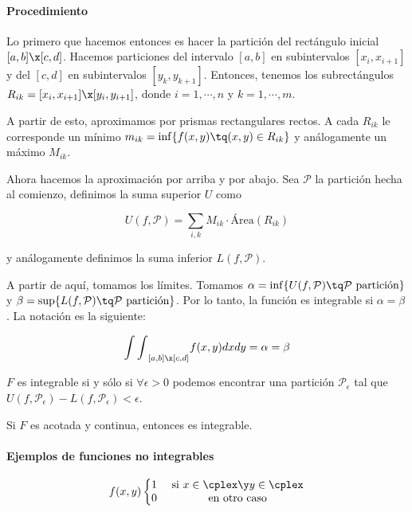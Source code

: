 \documentclass[12pt,a4paper,titlepage]{apuntes}
\begin{document}
\paragraph{Procedimiento}

Lo primero que hacemos entonces es hacer la partición del rectángulo inicial $[a,b]\x[c,d]$. Hacemos particiones del intervalo $[a,b]$ en subintervalos $[x_i, x_{i+1}]$ y del $[c,d]$ en subintervalos $[y_k, y_{k+1}]$. Entonces, tenemos los subrectángulos $R_{ik}=[x_i, x_{i+1}]\x[y_i, y_{i+1}]$, donde $i=1,\cdots,n$ y $k=1, \cdots, m$.

A partir de esto, aproximamos por prismas rectangulares rectos. A cada $R_{ik}$ le corresponde un mínimo $m_{ik} = \inf \{f(x,y)\tq (x,y)\in R_{ik}\}$ y análogamente un máximo $M_{ik}$.

Ahora hacemos la aproximación por arriba y por abajo. Sea $\mathcal{P}$ la partición hecha al comienzo, definimos la suma superior $U$ como

\[ U(f,\mathcal{P}) = \sum_{i,k} M_{ik} \cdot \text{Área}(R_{ik}) \]

y análogamente definimos la suma inferior $L(f,\mathcal{P})$.

A partir de aquí, tomamos los límites. Tomamos $\alpha = \inf\{U( f, \mathcal{P})\tq \mathcal{P} \text{ partición}\}$ y $\beta = \sup\{L(f, \mathcal{P})\tq \mathcal{P} \text{ partición}\}$. Por lo tanto, la función es integrable si $\alpha=\beta$. La notación es la siguiente:

\[ {\int\int}_{[a,b]\x[c,d]}f(x,y)dxdy=\alpha = \beta \]

\begin{theorem}
$F$ es integrable si y sólo si $\forall \epsilon > 0$ podemos encontrar una partición $\mathcal{P}_\epsilon$ tal que $U(f,\mathcal{P}_\epsilon) - L(f,\mathcal{P}_\epsilon) < \epsilon$.
\end{theorem}

\begin{theorem}
Si $F$ es acotada y continua, entonces es integrable.
\end{theorem}

\paragraph{Ejemplos de funciones no integrables} 

\[ f(x,y) \left\{ \begin{matrix}
1 &\text{ si } x\in\cplex \y y\in\cplex \\
0&\text{ en otro caso}
\end{matrix}\right.\]
\end{document}
